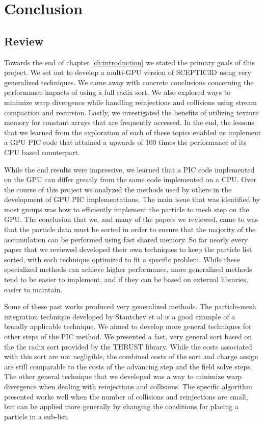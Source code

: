 \chapter{Conclusion}

\section{Review}
Towards the end of chapter \ref{ch:introduction} we stated the primary goals of this project. We set out to develop a multi-GPU version of SCEPTIC3D using very generalized techniques. We came away with concrete conclusions concerning the performance impacts of using a full radix sort. We also explored ways to minimize warp divergence while handling reinjections and collisions using stream compaction and recursion. Lastly, we investigated the benefits of utilizing texture memory for constant arrays that are frequently accessed. In the end, the lessons that we learned from the exploration of each of these topics enabled us implement a GPU PIC code that attained a upwards of 100 times the performance of its CPU based counterpart. 

While the end results were impressive, we learned that a PIC code implemented on the GPU can differ greatly from the same code implemented on a CPU. Over the course of this project we analyzed the methods used by others in the development of GPU PIC implementations. The main issue that was identified by most groups was how to efficiently implement the particle to mesh step on the GPU. The conclusion that we, and many of the papers we reviewed, came to was that the particle data must be sorted in order to ensure that the majority of the accumulation can be performed using fast shared memory. So far nearly every paper that we reviewed developed their own techniques to keep the particle list sorted, with each technique optimized to fit a specific problem. 
While these specialized methods can achieve higher performance, more generalized methods tend to be easier to implement, and if they can be based on external libraries, easier to maintain. 

Some of these past works produced very generalized methods. The particle-mesh integration technique developed by Stantchev et al is a good example of a broadly applicable technique. We aimed to develop more general techniques for other steps of the PIC method. We presented a fast, very general sort based on the the radix sort provided by the THRUST library. While the costs associated with this sort are not negligible, the combined costs of the sort and charge assign are still comparable to the costs of the advancing step and the field solve steps. The other general technique that we developed was a way to minimize warp divergence when dealing with reinjections and collisions. The specific algorithm presented works well when the number of collisions and reinjections are small, but can be applied more generally by changing the conditions for placing a particle in a sub-list. 

